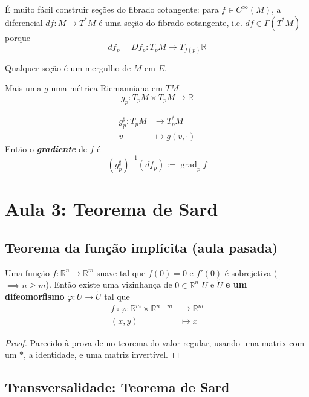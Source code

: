 É muito fácil construir seções do fibrado cotangente: para \(f \in C^\infty(M)\), a diferencial \(df :M \to T^*M\) é uma seção do fibrado cotangente, i.e. \(df \in \Gamma(T^*M)\) porque
\[df_p=Df_p:T_pM \to T_{f(p)}\mathbb{R}\]

\begin{exercise}\leavevmode
	Qualquer seção é um mergulho de \(M\) em \(E\).
\end{exercise}

\begin{thing6}{Mais uma}\leavevmode
$g$ uma métrica Riemanniana em \(TM\).
\[g_p:T_pM \times T_p M \to \mathbb{R}\]

\begin{align*}
	g_p^\sharp :T_pM &\longrightarrow  T^*_pM\\
	v &\longmapsto g(v,\cdot)
\end{align*}
Então o \textit{\textbf{gradiente}} de \(f\) é
\[(g^\sharp _p)^{-1}(df_p):=\operatorname{grad}_pf\]
\end{thing6}

\section{Aula 3: Teorema de Sard}

\subsection*{Teorema da função implícita (aula pasada)}

Uma função \(f:\mathbb{R}^n \to \mathbb{R}^m\) suave tal que \(f(0)=0\) e  \(f'(0)\) é sobrejetiva (\(\implies n \geq m\)). Então existe uma vizinhança de \(0 \in \mathbb{R}^n\) \(U\) e \(\tilde{U}\) \textbf{e um difeomorfismo} \(\varphi: U \to \tilde{U}\) tal que
\begin{align*}
	f \circ \varphi: \mathbb{R}^m \times \mathbb{R}^{n-m} &\longrightarrow \mathbb{R}^m \\
	(x,y) &\longmapsto x
\end{align*}

\begin{proof}\leavevmode
Parecido à prova de \cite{tus} no teorema do valor regular, usando uma matrix com um \(*\), a identidade, e uma matriz invertível.
\end{proof}

\subsection{Transversalidade: Teorema de Sard}

